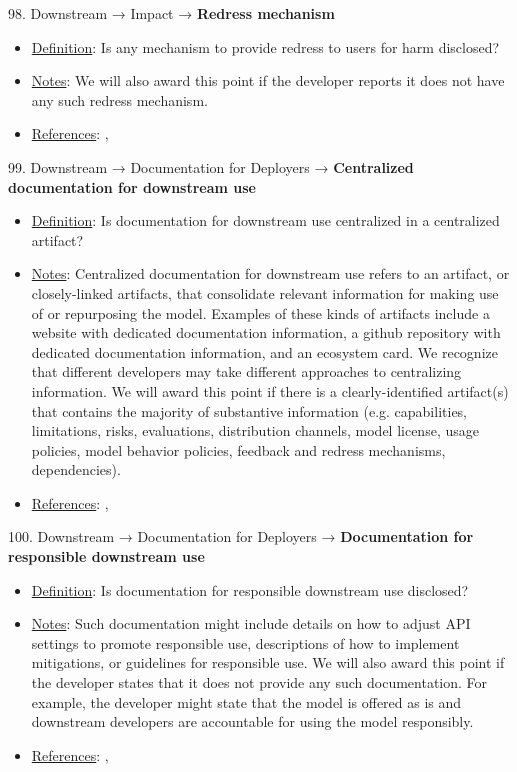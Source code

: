 98. Downstream → Impact → \textbf{Redress mechanism}
\vspace{-\parskip}
\begin{itemize}
\item
\underline{Definition}: Is any mechanism to provide redress to users for harm disclosed?
\item
\underline{Notes}: We will also award this point if the developer reports it does not have any such redress mechanism.
\item
\underline{References}: \citet{vipra2023}, \citet{bommasani2023ecosystem}
\end{itemize}


99. Downstream → Documentation for Deployers → \textbf{Centralized documentation for downstream use}
\vspace{-\parskip}
\begin{itemize}
\item
\underline{Definition}: Is documentation for downstream use centralized in a centralized artifact?
\item
\underline{Notes}: Centralized documentation for downstream use refers to an artifact, or closely-linked artifacts, that consolidate relevant information for making use of or repurposing the model. Examples of these kinds of artifacts include a website with dedicated documentation information, a github repository with dedicated documentation information, and an ecosystem card. We recognize that different developers may take different approaches to centralizing information. We will award this point if there is a clearly-identified artifact(s) that contains the majority of substantive information (e.g. capabilities, limitations, risks, evaluations, distribution channels, model license, usage policies, model behavior policies, feedback and redress mechanisms, dependencies).
\item
\underline{References}: \citet{gebru2021datasheets}, \citet{mitchell2019model}
\end{itemize}


100. Downstream → Documentation for Deployers → \textbf{Documentation for responsible downstream use}
\vspace{-\parskip}
\begin{itemize}
\item
\underline{Definition}: Is documentation for responsible downstream use disclosed?
\item
\underline{Notes}: Such documentation might include details on how to adjust API settings to promote responsible use, descriptions of how to implement mitigations, or guidelines for responsible use. We will also award this point if the developer states that it does not provide any such documentation. For example, the developer might state that the model is offered as is and downstream developers are accountable for using the model responsibly.
\item
\underline{References}: \citet{bommasani2023ecosystem}, \citet{brown2023allocating}
\end{itemize}


\clearpage